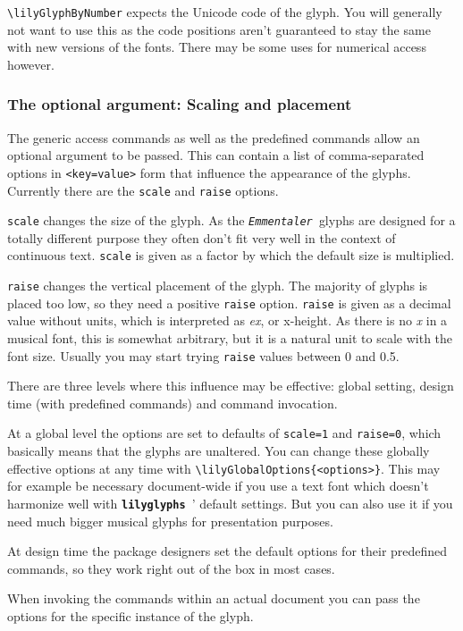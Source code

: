 \documentclass{article}
\newcommand*{\lilyglyphs}{\texttt{\textbf{lilyglyphs\,}}}
\newcommand*{\emmentaler}{\texttt{\textit{Emmentaler }}}
\newcommand*{\cmd}[1]{\texttt{\textbackslash #1}}
\begin{document}
\cmd{lilyGlyphByNumber} expects the Unicode code of the glyph. 
You will generally not want to use this as the code positions aren't guaranteed to stay the same with new versions of the fonts. 
There may be some uses for numerical access however.

\subsubsection{The optional argument: Scaling and placement}
The generic access commands as well as the predefined commands allow an optional argument to be passed.
This can contain a list of comma-separated options in \texttt{<key=value>} form that influence the appearance of the glyphs. Currently there are the \texttt{scale} and \texttt{raise} options.

\texttt{scale} changes the size of the glyph. 
As the \emmentaler glyphs are designed for a totally different purpose they often don't fit very well in the context of continuous text.
\texttt{scale} is given as a factor by which the default size is multiplied.

\texttt{raise} changes the vertical placement of the glyph.
The majority of glyphs is placed too low, so they need a positive \texttt{raise} option.
\texttt{raise} is given as a decimal value without units, which is interpreted as \emph{ex}, or x-height. 
As there is no \emph{x} in a musical font, this is somewhat arbitrary, but it is a natural unit to scale with the font size.
Usually you may start trying \texttt{raise} values between 0 and 0.5.

There are three levels where this influence may be effective: global setting, design time (with predefined commands) and command invocation.

At a global level the options are set to defaults of \texttt{scale=1} and \texttt{raise=0}, which basically means that the glyphs are unaltered.
You can change these globally effective options at any time with \cmd{lilyGlobalOptions\{<options>\}}.
This may for example be necessary document-wide if you use a text font which doesn't harmonize well with \lilyglyphs' default settings.
But you can also use it if you need much bigger musical glyphs for presentation purposes.

At design time the package designers set the default options for their predefined commands, so they work right out of the box in most cases.

When invoking the commands within an actual document you can pass the options for the specific instance of the glyph.
\end{document}
